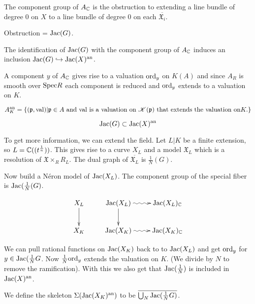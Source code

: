 \noindent The component group of $A_{\mathbb{C}}$ is the obstruction to extending a line bundle of degree 0 on $X$ to a line bundle of degree 0 on each $\overline{\mathfrak{X}_i}$.

\noindent Obstruction = $\mathrm{Jac}(G)$.

The identification of $\mathrm{Jac}(G)$ with the component group of $A_{\mathbb{C}}$ induces an inclusion $\mathrm{Jac}(G)\hookrightarrow \mathrm{Jac}(X)^{\mathrm{an}}$.

A component $y$ of $A_{\mathbb{C}}$ gives rise to a valuation $\mathrm{ord}_y$ on $K(A)$ and since $A_R$ is smooth over $\mathrm{Spec} R$ each component is reduced and $\mathrm{ord}_y$ extends to a valuation on $K$.


\[A_K^{\mathrm{an}} = \{(\mathfrak{p},\mathrm{val})|\mathfrak{p}\in A \text{ and } \mathrm{val} \text{ is a valuation on } \mathcal{K}(\mathfrak{p}) \text{ that extends the valuation on} K.\}\]

\[\mathrm{Jac}(G)\subset \mathrm{Jac}(X)^{\mathrm{an}}\]

To get more information, we can extend the field. Let $L|K$ be a finite extension, so $L = \mathbb{C}((t^{\frac{1}{n}}))$. This gives rise to a curve $X_L$ and a model $\mathfrak{X}_L$ which is a resolution of $\mathfrak{X}\times_R R_L$. The dual graph of $\overline{\mathfrak{X}_L}$ is $\frac{1}{N}(G)$.

Now build a N\'eron model of $\mathrm{Jac}(X_L)$. The component group of the special fiber is $\mathrm{Jac}(\frac{1}{N}(G)$.

\[
\xymatrix{
X_L \ar[d] & \Jac(X_L) \ar[d] \ar@{~>}[r] & \Jac(X_L)_{\CC} \\
X_K & \Jac(X_K) \ar@{~>}[r] & \Jac(X_K)_{\CC}
}
\]

\noindent We can pull rational functions on $\mathrm{Jac}(X_K)$ back  to to $\mathrm{Jac}(X_L)$ and get $\mathrm{ord}_y$ for $y\in\mathrm{Jac}(\frac{1}{N}G$. Now $\frac{1}{N}\mathrm{ord}_y$ extends the valuation on $K$. (We divide by $N$ to remove the ramification). With this we also get that $\mathrm{Jac}(\frac{1}{N})$ is included in $\mathrm{Jac}(X)^{\mathrm{an}}$.

\begin{definition} We define the skeleton $\Sigma(\mathrm{Jac}(X_K)^{\mathrm{an}})$ to be $\overline{\bigcup_N \mathrm{Jac}(\frac{1}{N}G)}$.
\end{definition}